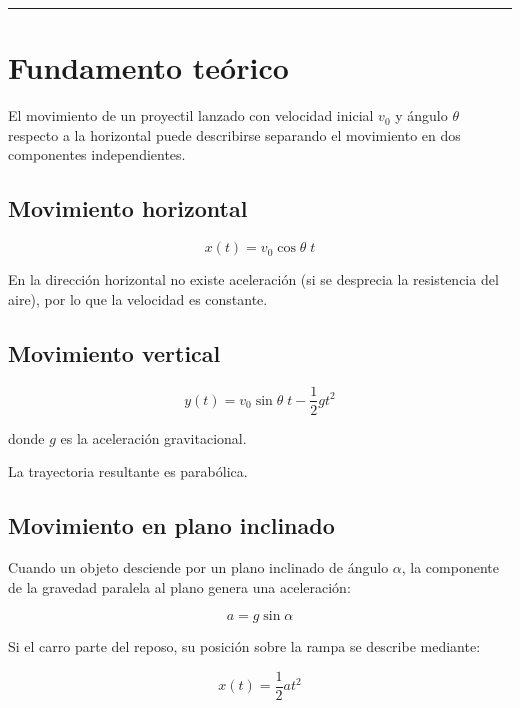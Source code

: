 \rule{\textwidth}{1pt}

\section*{Fundamento teórico}

El movimiento de un proyectil lanzado con velocidad inicial $v_0$ y ángulo $\theta$ respecto a la horizontal puede describirse separando el movimiento en dos componentes independientes.

\subsection*{Movimiento horizontal}

\begin{equation}
x(t) = v_0 \cos\theta \; t
\end{equation}

En la dirección horizontal no existe aceleración (si se desprecia la resistencia del aire), por lo que la velocidad es constante.

\subsection*{Movimiento vertical}

\begin{equation}
y(t) = v_0 \sin\theta \; t - \frac{1}{2} g t^2
\end{equation}

donde $g$ es la aceleración gravitacional.

La trayectoria resultante es parabólica.

\subsection*{Movimiento en plano inclinado}

Cuando un objeto desciende por un plano inclinado de ángulo $\alpha$, la componente de la gravedad paralela al plano genera una aceleración:

\begin{equation}
a = g \sin\alpha
\end{equation}

Si el carro parte del reposo, su posición sobre la rampa se describe mediante:

\begin{equation}
x(t) = \frac{1}{2} a t^2
\end{equation}

